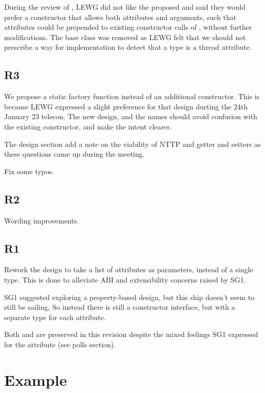 \documentclass{wg21}
\begin{document}
During the review of , LEWG did not like the proposed  and said they would prefer a constructor
that allows both attributes and arguments, such that attributes could be prepended to existing constructor calls of , without further modifications.
The  base class was removed as LEWG felt that we should not prescribe a way for implementation to detect that a type is a thread attribute.

\subsection{R3}

We propose a  static factory function
instead of an additional constructor.
This is because LEWG expressed a slight preference for that design durting the 24th January 23 telecon.
The new design, and the names should avoid confusion with the existing constructor, and make the intent clearer.

The design section add a note on the viability of NTTP and getter and setters as these questions came up during the meeting.

Fix some typos.

\subsection{R2}

Wording improvements.

\subsection{R1}

Rework the design to take a list of attributes as parameters, instead of a single type.
This is done to alleviate ABI and extensibility concerns raised by SG1.

SG1 suggested exploring a property-based design, but this ship doesn't seem to still be sailing,
So instead there is still a constructor interface, but with a separate type for each attribute.

Both  and  are preserved in this revision despite the
mixed feelings SG1 expressed for the  attribute (see polls section).

\section{Example}
\end{document}
